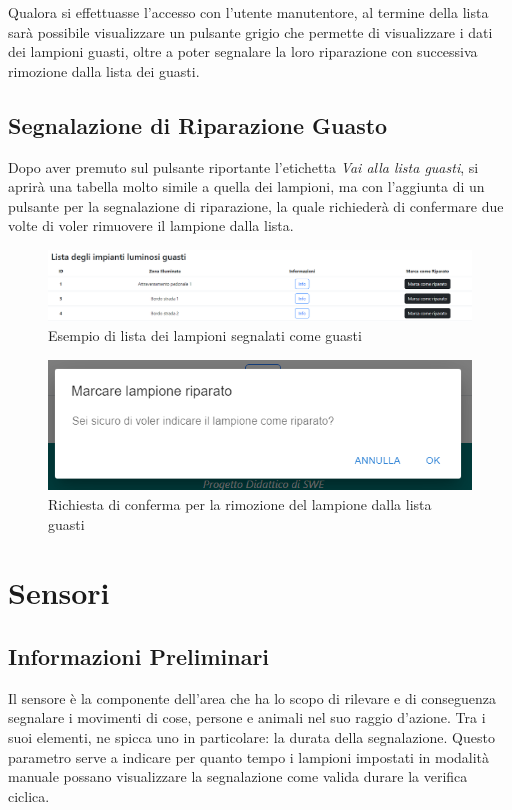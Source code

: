 \documentclass[a4paper, 12pt]{article}
\begin{document}
Qualora si effettuasse l'accesso con l'utente manutentore, al termine della lista sarà possibile visualizzare un pulsante grigio che permette di visualizzare i dati dei lampioni guasti, oltre a poter segnalare la loro riparazione con successiva rimozione dalla lista dei guasti.

\subsection{Segnalazione di Riparazione Guasto}
Dopo aver premuto sul pulsante riportante l'etichetta \textit{Vai alla lista guasti}, si aprirà una tabella molto simile a quella dei lampioni, ma con l'aggiunta di un pulsante per la segnalazione di riparazione, la quale richiederà di confermare due volte di voler rimuovere il lampione dalla lista.
\begin{figure}[H]
    \centering
    \includegraphics[width=\textwidth]{ListaGuastiVistaManutentore}
    \caption{Esempio di lista dei lampioni segnalati come guasti}
\end{figure}
\begin{figure}[H]
    \centering
    \includegraphics[width=\textwidth]{ModaleRiparazioneLampione}
    \caption{Richiesta di conferma per la rimozione del lampione dalla lista guasti}
\end{figure}

\newpage
\section{Sensori}
\subsection{Informazioni Preliminari}
Il sensore è la componente dell'area che ha lo scopo di rilevare e di conseguenza segnalare i movimenti di cose, persone e animali nel suo raggio d'azione. Tra i suoi elementi, ne spicca uno in particolare: la durata della segnalazione. Questo parametro serve a indicare per quanto tempo i lampioni impostati in modalità manuale possano visualizzare la segnalazione come valida durare la verifica ciclica.
\end{document}
